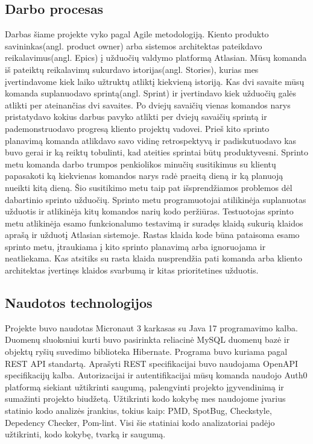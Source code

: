 \documentclass{VUMIFPSkursinis}
\begin{document}
	\subsection{Darbo procesas}
		Darbas šiame projekte vyko pagal Agile metodologiją.
		Kiento produkto savininkas(angl. product owner) arba sistemos architektas pateikdavo reikalavimus(angl. Epics) 
		į užduočių valdymo platformą Atlasian. Mūsų komanda iš pateiktų reikalavimų sukurdavo istorijas(angl. Stories),
		kurias mes įvertindavome kiek laiko užtruktų atliktį kiekvieną istoriją.
		Kas dvi savaite mūsų komanda suplanuodavo sprintą(angl. Sprint) ir įvertindavo kiek užduočių galės atlikti per ateinančias dvi savaites.
		Po dviejų savaičių vienas komandos narys pristatydavo kokius darbus pavyko atlikti per dviejų savaičių sprintą ir pademonstruodavo progresą kliento projektų vadovei.
		Prieš kito sprinto planavimą komanda atlikdavo savo vidinę retrospektyvą ir padiskutuodavo kas buvo gerai ir ką reiktų tobulinti, kad ateities sprintai būtų produktyvesni.
		Sprinto metu komanda darbo trumpos penkiolikos minučių susitikimus su klientų papasakoti ką kiekvienas komandos
		narys radė praeitą dieną ir ką planuoją nueikti kitą dieną.
		Šio susitikimo metu taip pat išsprendžiamos problemos dėl dabartinio sprinto užduočių.
		Sprinto metu programuotojai atilikinėja suplanuotas užduotis ir atlikinėja kitų komandos narių kodo peržiūras.
		Testuotojas sprinto metu atlikinėja esamo funkcionalumo testavimą ir suradęs klaidą sukurią klaidos aprašą ir užduotį Atlasian sistemoje.
		Rastas klaida kode būna pataisoma esamo sprinto metu, įtraukiama į kito sprinto planavimą arba ignoruojama ir 
		neatliekama.
		Kas atsitiks su rasta klaida nusprendžia pati komanda arba kliento architektas įvertinęs klaidos svarbumą ir kitas prioritetines užduotis.
		
	\subsection{Naudotos technologijos}
		Projekte buvo naudotas Micronaut 3 karkasas su Java 17 programavimo kalba.
		Duomenų sluoksniui kurti buvo pasirinkta reliacinė MySQL duomenų bazė ir objektų ryšių suvedimo biblioteka Hibernate.
		Programa buvo kuriama pagal REST API standartą. Aprašyti REST specifikacijai buvo naudojama OpenAPI specifikacijų kalba.
		Autorizacijai ir autentifikacijai mūsų komanda naudojo Auth0 platformą siekiant užtikrinti saugumą, palengvinti projekto įgyvendinimą ir sumažinti projekto 
		biudžetą.
		Užtikrinti kodo kokybę mes naudojome įvarius statinio kodo analizės įrankius, tokius kaip: PMD, SpotBug, Checkstyle, Depedency Checker, Pom-lint.
		Visi šie statiniai kodo analizatoriai padėjo užtikrinti, kodo kokybę, tvarką ir saugumą.
		
\end{document}
